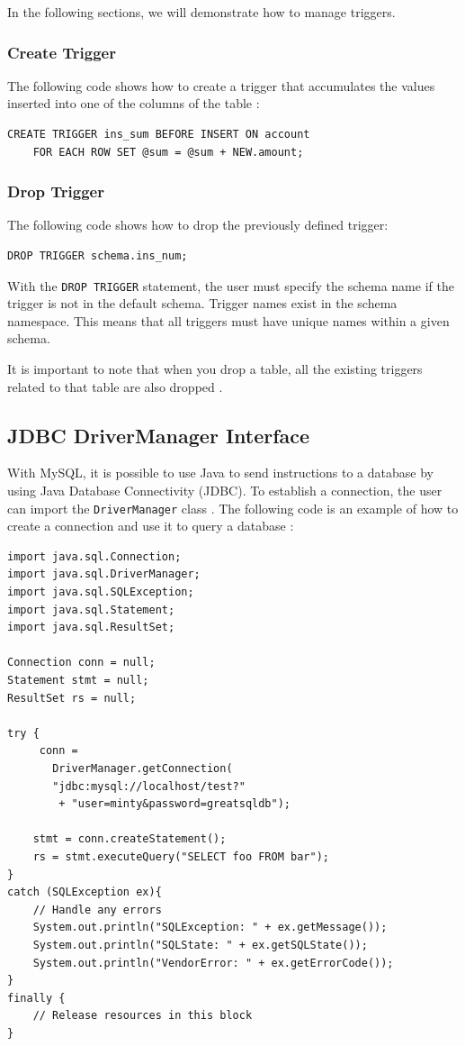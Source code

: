 \documentclass[12pt]{article}
\begin{document}
\noindent In the following sections, we will demonstrate how to manage triggers.

\subsubsection{Create Trigger}
\label{createTrigger}
The following code shows how to create a trigger that accumulates the values inserted into one of the columns of the table \parencite{TriggerSyntax}:
\begin{verbatim}
CREATE TRIGGER ins_sum BEFORE INSERT ON account
    FOR EACH ROW SET @sum = @sum + NEW.amount;
\end{verbatim}


\subsubsection{Drop Trigger}
\label{dropTrigger}
The following code shows how to drop the previously defined trigger:
\begin{verbatim}
DROP TRIGGER schema.ins_num;
\end{verbatim}

\noindent With the \verb|DROP TRIGGER| statement, the user must specify the schema name if the trigger is not in the default schema. Trigger names exist in the schema namespace. This means that all triggers must have unique names within a given schema.

It is important to note that when you drop a table, all the existing triggers related to that table are also dropped \parencite{TriggerSyntax}.


\subsection{JDBC DriverManager Interface}
\label{jdbc}
With MySQL, it is possible to use Java to send instructions to a database by using Java Database Connectivity (JDBC). To establish a connection, the user can import the \verb|DriverManager| class \parencite{JDBCConnector}. The following code is an example of how to create a connection and use it to query a database \parencite{executeSQL}:

\begin{verbatim}
import java.sql.Connection;
import java.sql.DriverManager;
import java.sql.SQLException;
import java.sql.Statement;
import java.sql.ResultSet;

Connection conn = null;
Statement stmt = null;
ResultSet rs = null;

try {
     conn =
       DriverManager.getConnection(
       "jdbc:mysql://localhost/test?"
        + "user=minty&password=greatsqldb");
        
    stmt = conn.createStatement();
    rs = stmt.executeQuery("SELECT foo FROM bar");
}
catch (SQLException ex){
    // Handle any errors
    System.out.println("SQLException: " + ex.getMessage());
    System.out.println("SQLState: " + ex.getSQLState());
    System.out.println("VendorError: " + ex.getErrorCode());
}
finally {
    // Release resources in this block
}
\end{verbatim}
\end{document}
